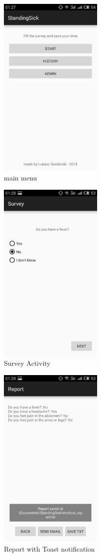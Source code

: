 \documentclass[conference]{IEEEtran}
\begin{document}
\begin{figure}[p!]
  \centering
      \includegraphics[width=2.0in]{./../img/main_menu.jpg}
  \caption{main menu}
  \label{main-menu-ss}
\end{figure}

\begin{figure}[p!]
  \centering
      \includegraphics[width=2.0in]{./../img/survey.jpg}
  \caption{Survey Activity}
  \label{poll-ss}
\end{figure}

\begin{figure}[p!]
  \centering
      \includegraphics[width=2.0in]{./../img/report.jpg}
  \caption{Report with Toast notification}
  \label{report-ss}
\end{figure}
\end{document}

